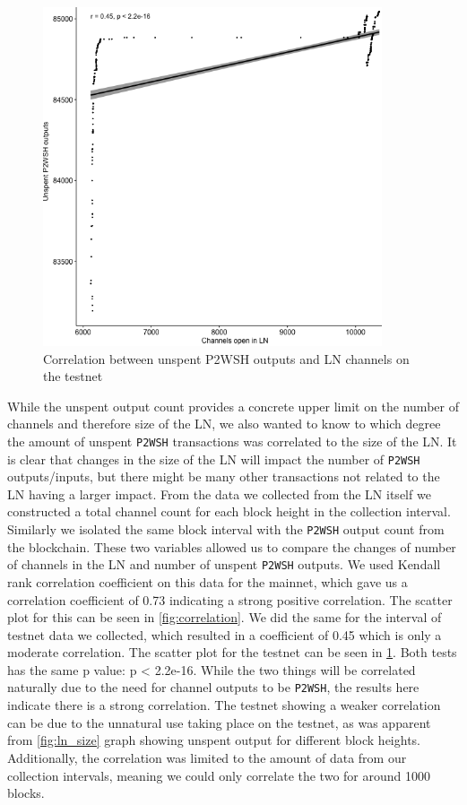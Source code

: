 \begin{figure}[h]
    \centering
    \includegraphics[width=10cm]{figures/graphs/channel_p2wsh_correlation_testnet.png}
    \caption{Correlation between unspent P2WSH outputs and LN channels on the testnet}
    \label{fig:correlation_testnet}
\end{figure}

While the unspent output count provides a concrete upper limit on the number of channels and therefore size of the LN, we also wanted to know to which degree the amount of unspent {\tt P2WSH} transactions was correlated to the size of the LN. It is clear that changes in the size of the LN will impact the number of {\tt P2WSH} outputs/inputs, but there might be many other transactions not related to the LN having a larger impact. From the data we collected from the LN itself we constructed a total channel count for each block height in the collection interval. Similarly we isolated the same block interval with the {\tt P2WSH} output count from the blockchain. These two variables allowed us to compare the changes of number of channels in the LN and number of unspent {\tt P2WSH} outputs. We used Kendall rank correlation coefficient on this data for the mainnet, which gave us a correlation coefficient of 0.73 indicating a strong positive correlation. The scatter plot for this can be seen in \cref{fig:correlation}.
We did the same for the interval of testnet data we collected, which resulted in a coefficient of 0.45 which is only a moderate correlation. 
The scatter plot for the testnet can be seen in \cref{fig:correlation_testnet}.
Both tests has the same p value: p < 2.2e-16. 
While the two things will be correlated naturally due to the need for channel outputs to be {\tt P2WSH}, the results here indicate there is a strong correlation. The testnet showing a weaker correlation can be due to the unnatural use taking place on the testnet, as was apparent from \cref{fig:ln_size} graph showing unspent output for different block heights. Additionally, the correlation was limited to the amount of data from our collection intervals, meaning we could only correlate the two for around 1000 blocks.

